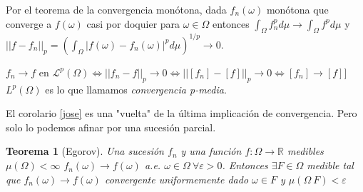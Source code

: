 \documentclass[11pt, a4paper]{article}
\theoremstyle{theorem-style}
\newtheorem{nth}{Teorema}[section]
\theoremstyle{definition-style}
\theoremstyle{remark-style}
\theoremstyle{example-style}
\begin{document}
Por el teorema de la convergencia monótona, dada $f_{n}(\omega)$ monótona que
converge a $f(\omega)$ casi por doquier para $\omega \in \Omega$ entonces
$\int_{\Omega}f_{n}^{p}d\mu \rightarrow \int_{\Omega}f^{p}d\mu$ y $||f - f_{n}||_{p}
= \left(\int_{\Omega}|f(\omega)-f_{n}(\omega)|^{p}d\mu\right)^{1/p} \rightarrow
0$.

$f_{n} \rightarrow f$ en $\mathcal L^{p}(\Omega) \Leftrightarrow ||f_{n}-f||_{p}
\rightarrow 0 \Leftrightarrow ||[f_{n}]-[f]||_{p} \rightarrow 0 \Leftrightarrow
{[f_{n}]} \rightarrow [f]]$ $L^{p}(\Omega)$ es lo que llamamos
\textit{convergencia p-media}. 

El corolario \ref{jose} es una "vuelta" de la última implicación de
convergencia. Pero solo lo podemos afinar por una sucesión parcial.

\begin{nth}[Egorov]
  Una sucesión  $f_{n}$ y una función $f:\Omega \rightarrow \mathbb R $ medibles
  $\mu(\Omega) < \infty $ ${f_{n}(\omega)} \rightarrow f(\omega)$ a.e. $ \omega \in \Omega \
  \forall \varepsilon > 0$. Entonces $ \exists F \in \Omega $ medible tal que
  ${f_{n}(\omega)} \rightarrow f(\omega)$ convergente uniformemente dado $\omega
  \in F$ y $\mu(\Omega \ F) < \varepsilon$
\end{nth}
\end{document}
